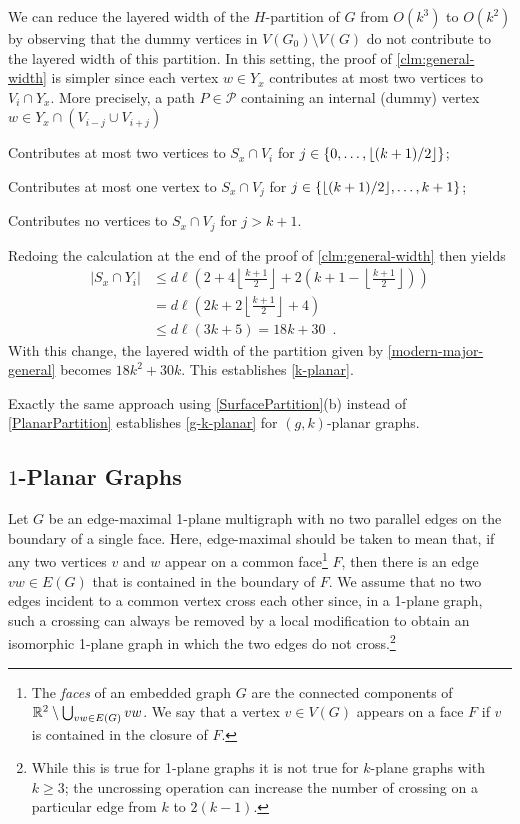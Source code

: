 \documentclass{patmorin}
\DeclarePairedDelimiter{\floor}{\lfloor}{\rfloor}
\renewcommand{\ge}{\geqslant}
\renewcommand{\le}{\leqslant}
\begin{document}
We can reduce the layered width of the $H$-partition of $G$ from $O(k^3)$ to $O(k^2)$ by observing that the dummy vertices in $V(G_0)\setminus V(G)$ do not contribute to the layered width of this partition.  In this setting, the proof of \cref{clm:general-width} is simpler since each vertex $w\in Y_x$ contributes at most two vertices to $V_i\cap Y_x$.  More precisely, a path $P\in\mathcal{P}$ containing an internal (dummy) vertex $w\in Y_x\cap (V_{i-j}\cup V_{i+j})$
\begin{compactenum}
  \item Contributes at most two vertices to $S_x\cap V_i$ for $j\in\{0,\ldots,\floor{(k+1)/2}\}$;
  \item Contributes at most one vertex to $S_x\cap V_j$ for $j\in\{\floor{(k+1)/2},\ldots,k+1\}$; 
  \item Contributes no vertices to $S_x\cap V_j$ for $j > k+1$.
\end{compactenum}
Redoing the calculation at the end of the proof of \cref{clm:general-width} then yields 
\begin{align*}
    |S_x\cap Y_i| &\le d\ell\left( 
       2 
       + 4\left\lfloor\frac{k+1}{2}\right\rfloor 
       + 2\left(k+1-\left\lfloor\frac{k+1}{2}\right\rfloor\right)
       \right)\\
       & =
       d\ell\left(
         2k + 2\left\lfloor\frac{k+1}{2}\right\rfloor + 4
       \right) \\
       & \le
       d\ell(3k+5) = 18k+30 \enspace .
\end{align*}    
With this change, the layered width of the partition given by \cref{modern-major-general} becomes $18k^2+30k$.  This establishes \cref{k-planar}.

Exactly the same approach using \cref{SurfacePartition}(b) instead of \cref{PlanarPartition} establishes 
\cref{g-k-planar} for $(g,k)$-planar graphs. 


\subsection{\boldmath  $1$-Planar Graphs}
\label{sec-1-planar}

Let $G$ be an edge-maximal 1-plane multigraph with no two parallel edges on the boundary of a single face.  Here, edge-maximal should be taken to mean that, if any two vertices $v$ and $w$ appear on a common face\footnote{The \emph{faces} of an embedded graph $G$ are the connected components of $\mathbb{R}^2\setminus \bigcup_{vw\in E(G)} vw$.  We say that a vertex $v\in V(G)$ appears on a face $F$ if $v$ is contained in the closure of $F$.} $F$, then there is an edge $vw\in E(G)$ that is contained in the boundary of $F$.  We assume that no two edges incident to a common vertex cross each other since, in a 1-plane graph, such a crossing can always be removed by a local modification to obtain an isomorphic 1-plane graph in which the two edges do not cross.\footnote{While this is true for 1-plane graphs it is not true for $k$-plane graphs with $k\ge 3$; the uncrossing operation can increase the number of crossing on a particular edge from $k$ to $2(k-1)$.}
\end{document}
